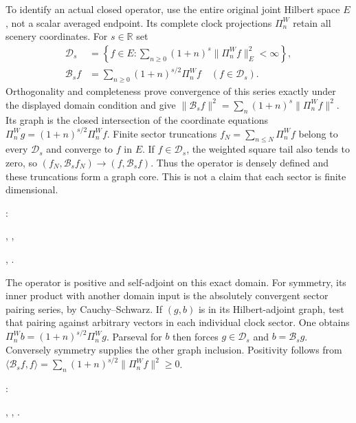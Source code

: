 \documentclass[11pt]{article}
\newcommand{\R}{\mathbb R}\newcommand{\E}{\mathbb E}
\begin{document}
To identify an actual closed operator, use the entire original joint
Hilbert space $E$, not a scalar averaged endpoint. Its complete clock
projections $\Pi_n^W$ retain all scenery coordinates. For $s\in\R$ set
\begin{align}
 \mathcal D_s&=\left\{f\in E:
              \sum_{n\geq0}(1+n)^s\|\Pi_n^W f\|_E^2<\infty\right\},
             \label{eq:besseldomain}\\
 \mathcal B_sf&=\sum_{n\geq0}(1+n)^{s/2}\Pi_n^Wf
                          \quad(f\in\mathcal D_s).
\end{align}
Orthogonality and completeness prove convergence of this series exactly
under the displayed domain condition and give
$\|\mathcal B_sf\|^2=\sum_n(1+n)^s\|\Pi_n^Wf\|^2$.
Its graph is the closed intersection of the coordinate equations
$\Pi_n^Wg=(1+n)^{s/2}\Pi_n^Wf$. Finite sector truncations
$f_N=\sum_{n\leq N}\Pi_n^Wf$ belong to every $\mathcal D_s$ and
converge to $f$ in $E$. If $f\in\mathcal D_s$, the weighted square tail
also tends to zero, so $(f_N,\mathcal B_sf_N)\to(f,\mathcal B_sf)$.
Thus the operator is densely defined and these truncations form a graph
core. This is not a claim that each sector is finite dimensional.
\par\noindent{}:
\par\noindent{}, ,
\par\noindent{}, .

The operator is positive and self-adjoint on this exact domain.
For symmetry, its inner product with another domain input is the
absolutely convergent sector pairing series, by Cauchy--Schwarz.
If $(g,b)$ is in its Hilbert-adjoint graph, test that pairing against
arbitrary vectors in each individual clock sector. One obtains
$\Pi_n^W b=(1+n)^{s/2}\Pi_n^W g$. Parseval for $b$ then forces
$g\in\mathcal D_s$ and $b=\mathcal B_sg$. Conversely symmetry supplies
the other graph inclusion. Positivity follows from
$\langle\mathcal B_sf,f\rangle=
\sum_n(1+n)^{s/2}\|\Pi_n^W f\|^2\geq0$.
\par\noindent{}:
\par\noindent{}, , .
\end{document}
